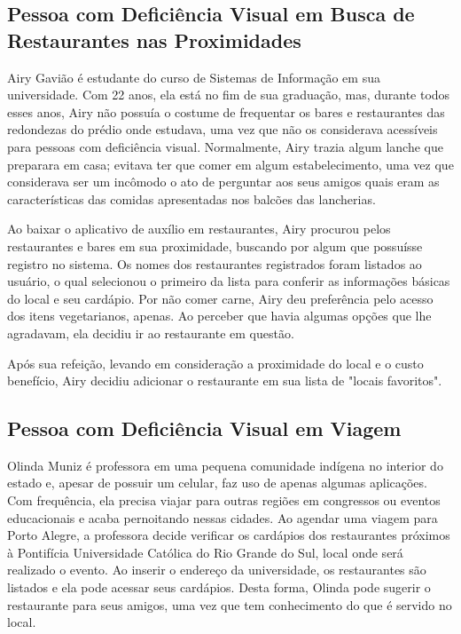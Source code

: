\subsection{Pessoa com Deficiência Visual em Busca de Restaurantes nas Proximidades}
Airy Gavião é estudante do curso de Sistemas de Informação em sua universidade. Com 22 anos, ela está no fim de sua graduação, mas, durante todos esses anos, Airy não possuía o costume de frequentar os bares e restaurantes das redondezas do prédio onde estudava, uma vez que não os considerava acessíveis para pessoas com deficiência visual. Normalmente, Airy trazia algum lanche que preparara em casa; evitava ter que comer em algum estabelecimento, uma vez que considerava ser um incômodo o ato de perguntar aos seus amigos quais eram as características das comidas apresentadas nos balcões das lancherias. 

Ao baixar o aplicativo de auxílio em restaurantes, Airy procurou pelos restaurantes e bares em sua proximidade, buscando por algum que possuísse registro no sistema. Os nomes dos restaurantes registrados foram listados ao usuário, o qual selecionou o primeiro da lista para conferir as informações básicas do local e seu cardápio. Por não comer carne, Airy deu preferência pelo acesso dos itens vegetarianos, apenas. Ao perceber que havia algumas opções que lhe agradavam, ela decidiu ir ao restaurante em questão.

Após sua refeição, levando em consideração a proximidade do local e o custo benefício, Airy decidiu adicionar o restaurante em sua lista de "locais favoritos".

\subsection{Pessoa com Deficiência Visual em Viagem}
Olinda Muniz é professora em uma pequena comunidade indígena no interior do estado e, apesar de possuir um celular, faz uso de apenas algumas aplicações. Com frequência, ela precisa viajar para outras regiões em congressos ou eventos educacionais e acaba pernoitando nessas cidades. Ao agendar uma viagem para Porto Alegre, a professora decide verificar os cardápios dos restaurantes próximos à Pontifícia Universidade Católica do Rio Grande do Sul, local onde será realizado o evento. Ao inserir o endereço da universidade, os  restaurantes são listados e ela pode acessar seus cardápios. Desta forma, Olinda pode sugerir o restaurante para seus amigos, uma vez que tem conhecimento do que é servido no local. 

